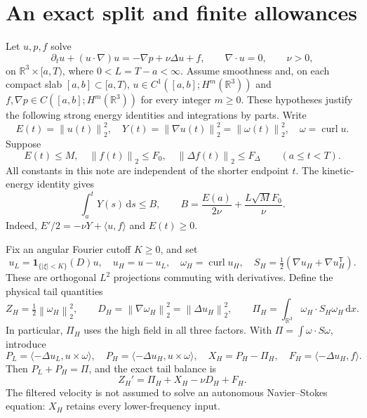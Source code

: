 \documentclass[11pt]{article}
\newcommand{\R}{\mathbb R}
\newcommand{\dd}{\,\mathrm d}
\newcommand{\norm}[1]{\left\lVert#1\right\rVert}
\newcommand{\curl}{\operatorname{curl}}
\begin{document}
\begin{abstract}
removes these particular cycles but introduces a signed viscous defect;
an exact example shows that this defect cannot simply be absorbed.
For an approximately planar-polarized Fourier belt of width proportional
to the square root of frequency, a further estimate pays the complete
quintic renewal uniformly over all shells. It retains the axial velocity
generated by pressure. Persistence of this geometry and interactions
with its complement remain uncontrolled.
The common-axis hypothesis is essential for that payment: two exactly
planar families in separate dyadic shells, with different axes, have
positive mixed renewal. A concentrated whole-space construction gives
actual unforced bursts exceeding an energy-only allowance even for
these initially coherent families. Their later geometry is not assumed
invariant, and a full-initial-data history bound remains open.
\end{abstract}

\section{An exact split and finite allowances}

Let $u,p,f$ solve
\[
 \partial_tu+(u\cdot\nabla)u=-\nabla p+\nu\Delta u+f,
 \qquad \nabla\cdot u=0,\qquad \nu>0,
\]
on $\R^3\times[a,T)$, where $0<L=T-a<\infty$. Assume smoothness and, on
each compact slab $[a,b]\subset[a,T)$, $u\in C^1([a,b];H^m(\R^3))$
and $f,\nabla p\in C([a,b];H^m(\R^3))$ for every integer $m\geq0$.
These hypotheses justify the following strong energy identities and
integrations by parts. Write
\[
 E(t)=\norm{u(t)}_2^2,\quad Y(t)=\norm{\nabla u(t)}_2^2
       =\norm{\omega(t)}_2^2,\quad \omega=\curl u.
\]
Suppose
\[
 E(t)\leq M,\quad \norm{f(t)}_2\leq F_0,
 \quad\norm{\Delta f(t)}_2\leq F_\Delta\qquad(a\leq t<T).
\]
All constants in this note are independent of the shorter endpoint $t$.
The kinetic-energy identity gives
\begin{equation}\label{eq:B}
 \int_a^tY(s)\dd s\leq B,
 \qquad B=\frac{E(a)}{2\nu}+\frac{L\sqrt M F_0}{\nu}.
\end{equation}
Indeed, $E'/2=-\nu Y+\langle u,f\rangle$ and $E(t)\geq0$.

Fix an angular Fourier cutoff $K\geq0$, and set
\[
 u_L=\mathbf1_{\{|\xi|<K\}}(D)u,\quad u_H=u-u_L,
 \quad\omega_H=\curl u_H,\quad S_H=\tfrac12(\nabla u_H+\nabla u_H^\mathsf T).
\]
These are orthogonal $L^2$ projections commuting with derivatives.
Define the physical tail quantities
\[
 Z_H=\tfrac12\norm{\omega_H}_2^2,\qquad
 D_H=\norm{\nabla\omega_H}_2^2=\norm{\Delta u_H}_2^2,
 \qquad \Pi_H=\int_{\R^3}\omega_H\cdot S_H\omega_H\dd x.
\]
In particular, $\Pi_H$ uses the high field in all three factors. With
$\Pi=\int\omega\cdot S\omega$, introduce
\[
 P_L=\langle-\Delta u_L,u\times\omega\rangle,
 \quad P_H=\langle-\Delta u_H,u\times\omega\rangle,
 \quad X_H=P_H-\Pi_H,\quad F_H=\langle-\Delta u_H,f\rangle.
\]
Then $P_L+P_H=\Pi$, and the exact tail balance is
\begin{equation}\label{eq:balance}
 Z_H'=\Pi_H+X_H-\nu D_H+F_H.
\end{equation}
The filtered velocity is not assumed to solve an autonomous
Navier--Stokes equation: $X_H$ retains every lower-frequency input.
\end{document}
